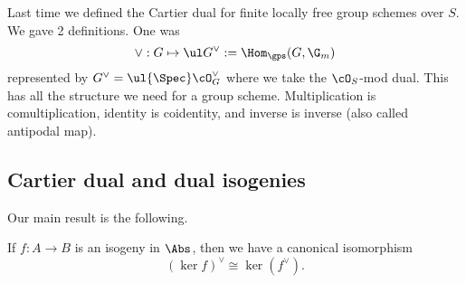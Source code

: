 
Last time we defined the Cartier dual for finite locally free group schemes over $S$. We gave 2 definitions. One was
\[
\vee: G\mapsto \ul G^{\vee}:=\Hom_{\gps}(G,\G_m)
\]
represented by $G^{\vee}=\ul{\Spec} \cO_G^{\vee}$ where we take the $\cO_S$-mod dual. This has all the structure we need for a group scheme. Multiplication is comultiplication, identity is coidentity, and inverse is inverse (also called antipodal map). 

\subsection{Cartier dual and dual isogenies}

Our main result is the following.
\begin{thm}
If $f:A\to B$ is an isogeny in $\Abs$, then we have a canonical isomorphism 
\[
(\ker f)^{\vee}\cong \ker (f^{\vee}).
\]
\end{thm}
